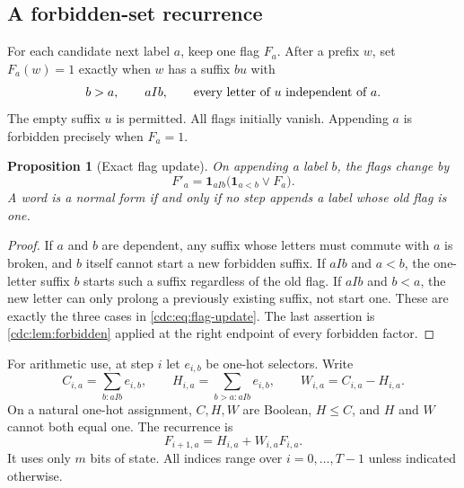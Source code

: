 \documentclass[11pt,a4paper]{article}
\newtheorem{proposition}[proposition]{Proposition}
\theoremstyle{definition}
\theoremstyle{remark}
\newcommand{\ind}{\mathbf 1}
\begin{document}
\subsection{A forbidden-set recurrence}
For each candidate next label $a$, keep one flag $F_a$. After a prefix $w$, set $F_a(w)=1$ exactly when $w$ has a suffix $bu$ with
\[
b>a,\qquad aIb,\qquad\hbox{every letter of }u\hbox{ independent of }a.
\]
The empty suffix $u$ is permitted. All flags initially vanish. Appending $a$ is forbidden precisely when $F_a=1$.

\begin{proposition}[Exact flag update]\label{cdc:prop:flags}
On appending a label $b$, the flags change by
\begin{equation}\label{cdc:eq:flag-update}
F'_a=\ind_{aIb}\bigl(\ind_{a<b}\mathbin{\lor}F_a\bigr).
\end{equation}
A word is a normal form if and only if no step appends a label whose old flag is one.
\end{proposition}
\begin{proof}
If $a$ and $b$ are dependent, any suffix whose letters must commute with $a$ is broken, and $b$ itself cannot start a new forbidden suffix. If $aIb$ and $a<b$, the one-letter suffix $b$ starts such a suffix regardless of the old flag. If $aIb$ and $b<a$, the new letter can only prolong a previously existing suffix, not start one. These are exactly the three cases in \eqref{cdc:eq:flag-update}. The last assertion is \cref{cdc:lem:forbidden} applied at the right endpoint of every forbidden factor.
\end{proof}

For arithmetic use, at step $i$ let $e_{i,b}$ be one-hot selectors. Write
\begin{equation}\label{cdc:eq:CH}
C_{i,a}=\sum_{b:aIb}e_{i,b},\qquad
H_{i,a}=\sum_{b>a:aIb}e_{i,b},\qquad
W_{i,a}=C_{i,a}-H_{i,a}.
\end{equation}
On a natural one-hot assignment, $C,H,W$ are Boolean, $H\le C$, and $H$ and $W$ cannot both equal one. The recurrence is
\begin{equation}\label{cdc:eq:flag-poly}
F_{i+1,a}=H_{i,a}+W_{i,a}F_{i,a}.
\end{equation}
It uses only $m$ bits of state. All indices range over $i=0,\ldots,T-1$ unless indicated otherwise.
\end{document}
